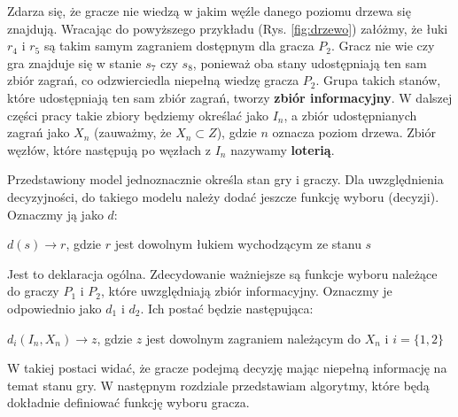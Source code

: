 Zdarza się, że gracze nie wiedzą w jakim węźle danego poziomu drzewa się znajdują. Wracając do powyższego przykładu (Rys. \ref{fig:drzewo}) załóżmy, że łuki $r_4$ i $r_5$ są takim samym zagraniem dostępnym dla gracza $P_2$. Gracz nie wie czy gra znajduje się w stanie $s_7$ czy $s_8$, ponieważ oba stany udostępniają ten sam zbiór zagrań, co odzwierciedla niepełną wiedzę gracza $P_2$. Grupa takich stanów, które udostępniają ten sam zbiór zagrań, tworzy \textbf{zbiór informacyjny}. W dalszej części pracy takie zbiory będziemy określać jako $I_n$, a zbiór udostępnianych zagrań jako $X_n$ (zauważmy, że $X_n \subset Z$), gdzie $n$ oznacza poziom drzewa. Zbiór węzłów, które następują po węzłach z $I_n$ nazywamy \textbf{loterią}.

Przedstawiony model jednoznacznie określa stan gry i graczy. Dla uwzględnienia decyzyjności, do takiego modelu należy dodać jeszcze funkcję wyboru (decyzji). Oznaczmy ją jako $d$:
\begin{center}
	$d(s) \rightarrow r$, gdzie $r$ jest dowolnym łukiem wychodzącym ze stanu $s$
\end{center}

Jest to deklaracja ogólna. Zdecydowanie ważniejsze są funkcje wyboru należące do graczy $P_1$ i $P_2$, które uwzględniają zbiór informacyjny. Oznaczmy je odpowiednio jako $d_1$ i $d_2$. Ich postać będzie następująca:

\begin{center}
	$d_i(I_n, X_n) \rightarrow z$, gdzie $z$ jest dowolnym zagraniem należącym do $X_n$ i $i = \{1, 2\}$
\end{center}
W takiej postaci widać, że gracze podejmą decyzję mając niepełną informację na temat stanu gry. W następnym rozdziale przedstawiam algorytmy, które będą dokładnie definiować funkcję wyboru gracza.

